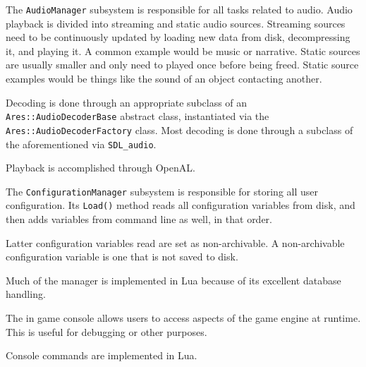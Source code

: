 \page 
\setuppapersize[diagram]
    {}
\page
\setuppapersize[main]

\page
{}
The {\tt AudioManager} subsystem is responsible for all tasks related to audio. Audio playback is divided into streaming and static audio sources. Streaming sources need to be continuously updated by loading new data from disk, decompressing it, and playing it. A common example would be music or narrative. Static sources are usually smaller and only need to played once before being freed. Static source examples would be things like the sound of an object contacting another.

Decoding is done through an appropriate subclass of an {\tt Ares::AudioDecoderBase} abstract class, instantiated via the {\tt Ares::AudioDecoderFactory} class. Most decoding is done through a subclass of the aforementioned via {\tt SDL_audio}.

Playback is accomplished through OpenAL.

    {}

\page
{}
The {\tt ConfigurationManager} subsystem is responsible for storing all user configuration. Its {\tt Load()} method reads all configuration variables from disk, and then adds variables from command line as well, in that order. 

Latter configuration variables read are set as non-archivable. A non-archivable configuration variable is one that is not saved to disk.

Much of the manager is implemented in Lua because of its excellent database handling.

    {}

\page
{}
The in game console allows users to access aspects of the game engine at runtime. This is useful for debugging or other purposes.

Console commands are implemented in Lua.

    {}

